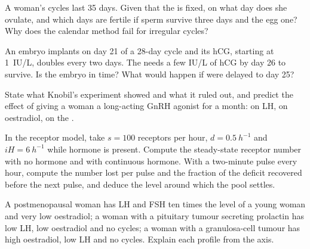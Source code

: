 \begin{exercise}[$\star\star$]\label{exo:b2:reproductive-hormones:7}
A woman's cycles last 35 days. Given that the  is
fixed, on what day does she ovulate, and which days are fertile if
sperm survive three days and the egg one? Why does the calendar
method fail for irregular cycles?
\end{exercise}

\begin{exercise}[$\star\star$]\label{exo:b2:reproductive-hormones:8}
An embryo implants on day 21 of a 28-day cycle and its hCG, starting
at \qty{1}{IU/L}, doubles every two days. The  needs a
few IU/L of hCG by day 26 to survive. Is the embryo in time? What
would happen if  were delayed to day 25?
\end{exercise}

\begin{exercise}[$\star\star$]\label{exo:b2:reproductive-hormones:9}
State what Knobil's experiment showed and what it ruled out, and
predict the effect of giving a woman a long-acting GnRH agonist for
a month: on LH, on oestradiol, on the .
\end{exercise}

\begin{exercise}[$\star\star\star$]\label{exo:b2:reproductive-hormones:10}
In the receptor model, take $s = 100$ receptors per hour, $d =
\qty{0.5}{h^{-1}}$ and $iH = \qty{6}{h^{-1}}$ while hormone is
present. Compute the steady-state receptor number with no hormone
and with continuous hormone. With a two-minute pulse every hour,
compute the number lost per pulse and the fraction of the deficit
recovered before the next pulse, and deduce the level around which
the pool settles.
\end{exercise}

\begin{exercise}[$\star\star\star$]\label{exo:b2:reproductive-hormones:11}
A postmenopausal woman has LH and FSH ten times the level of a young
woman and very low oestradiol; a woman with a pituitary tumour
secreting prolactin has low LH, low oestradiol and no cycles; a
woman with a granulosa-cell tumour has high oestradiol, low LH and
no cycles. Explain each profile from the axis.
\end{exercise}

